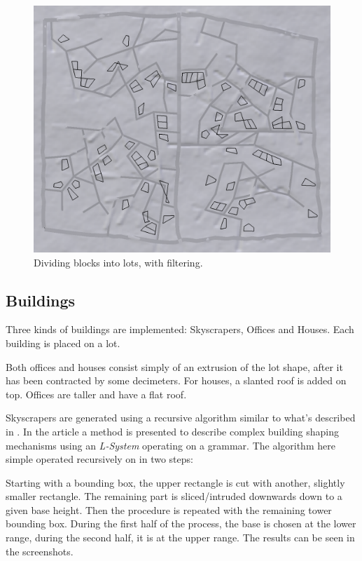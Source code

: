 \documentclass[a4paper,12pt]{scrartcl}
\begin{document}
\begin{figure}[h]
\center
\includegraphics[width=\textwidth]{lots.png}
\caption{Dividing blocks into lots, with filtering.}
\label{fig:lots}
\end{figure}


\subsection{Buildings}
Three kinds of buildings are implemented: Skyscrapers, Offices and Houses. Each building is placed on a lot.

Both offices and houses consist simply of an extrusion of the lot shape, after it has been contracted by some decimeters. For houses, a slanted roof is added on top. Offices are taller and have a flat roof.

Skyscrapers are generated using a recursive algorithm similar to what's described in \cite{Pari2001}. In the article a method is presented to describe complex building shaping mechanisms using an \emph{L-System} operating on a grammar. The algorithm here simple operated recursively on in two steps:

Starting with a bounding box, the upper rectangle is cut with another, slightly smaller rectangle. The remaining part is sliced/intruded downwards down to a given base height. Then the procedure is repeated with the remaining tower bounding box. During the first half of the process, the base is chosen at the lower range, during the second half, it is at the upper range. The results can be seen in the screenshots.
\end{document}
